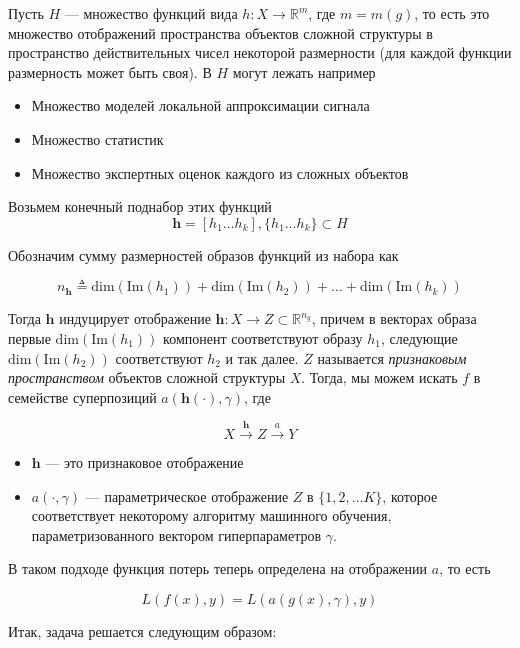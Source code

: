 \documentclass[12pt, fleqn, unicode]{article}
\newcommand{\bh}{\mathbf{h}}
\newcommand{\R}{\mathbb{R}}
\begin{document}
Пусть $H$ --- множество функций вида
$h: X \to \R^m$, где $m = m(g)$, то есть это множество отображений
пространства объектов сложной структуры в пространство действительных чисел
некоторой размерности (для каждой функции размерность может быть своя). В
$H$ могут лежать например

\begin{itemize}
    \item Множество моделей локальной аппроксимации сигнала
    \item Множество статистик
    \item Множество экспертных оценок каждого из сложных объектов
\end{itemize}

Возьмем конечный поднабор этих функций
$$
\bh = [h_1\ldots h_k], \{h_1\ldots h_k\} \subset H
$$

Обозначим сумму размерностей образов функций из набора как

$$
n_\bh \triangleq \mathrm{dim}(\mathrm{Im}(h_1)) +
\mathrm{dim}(\mathrm{Im}(h_2)) + \ldots +
\mathrm{dim}(\mathrm{Im}(h_k))
$$

Тогда $\bh$ индуцирует отображение $\bh: X \to Z \subset \R^{n_g}$,
причем в векторах образа первые $\mathrm{dim}(\mathrm{Im}(h_1))$ компонент соответствуют
образу $h_1$, следующие $\mathrm{dim}(\mathrm{Im}(h_2))$ соответствуют $h_2$
и так далее. $Z$ называется \textit{признаковым пространством}
объектов сложной структуры $X$. Тогда, мы можем искать $f$ в семействе
суперпозиций $a(\bh(\cdot), \gamma)$, где

$$
X \xrightarrow{\bh} Z \xrightarrow{a} Y
$$

\begin{itemize}
    \item $\bh$ --- это признаковое отображение
    \item $a(\cdot, \gamma)$ --- параметрическое отображение $Z$ в $\{1, 2, \ldots K\}$,
    которое соответствует некоторому алгоритму машинного обучения,
    параметризованного вектором гиперпараметров $\gamma$.
\end{itemize}

В таком подходе функция потерь теперь определена
на отображении $a$, то есть

$$
L(f(x), y) = L(a(g(x), \gamma), y)
$$

Итак, задача решается следующим образом:
\end{document}
